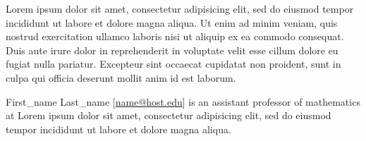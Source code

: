 \documentclass{article}
\begin{document}
Lorem ipsum dolor sit amet, consectetur adipisicing elit, sed do eiusmod tempor incididunt ut labore et dolore magna aliqua. Ut enim ad minim veniam, quis nostrud exercitation ullamco laboris nisi ut aliquip ex ea commodo consequat. Duis aute irure dolor in reprehenderit in voluptate velit esse cillum dolore eu fugiat nulla pariatur. Excepteur sint occaecat cupidatat non proident, sunt in culpa qui officia deserunt mollit anim id est laborum.

\printnotes




 
\begin{info}
First\_name Last\_name [\url{name@host.edu}] is an assistant professor of mathematics at Lorem ipsum dolor sit amet, consectetur adipisicing elit, sed do eiusmod tempor incididunt ut labore et dolore magna aliqua.

\end{info}
\end{document}

